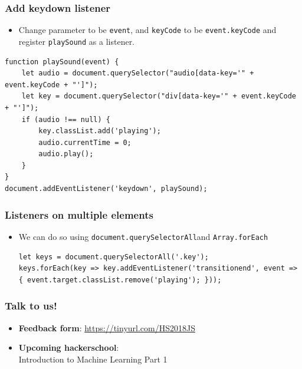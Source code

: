 \documentclass[handout,12pt]{beamer}
\begin{document}
\begin{frame}[fragile]
	\frametitle{Add keydown listener}
	\begin{itemize}
		\item Change parameter to be \texttt{event}, and \texttt{keyCode} to be \texttt{event.keyCode} and register \texttt{playSound} as a listener.
	\end{itemize}
	\begin{verbatim}
function playSound(event) {
	let audio = document.querySelector("audio[data-key='" + event.keyCode + "']");
	let key = document.querySelector("div[data-key='" + event.keyCode + "']");
	if (audio !== null) {
		key.classList.add('playing');
		audio.currentTime = 0;
		audio.play();
	}
}
document.addEventListener('keydown', playSound);
	\end{verbatim}
\end{frame}

\begin{frame}[fragile]
	\frametitle{Listeners on multiple elements}
	\begin{itemize}
		\item We can do so using \texttt{document.querySelectorAll}\footnotemark and \texttt{Array.forEach}\footnotemark\pause
		\begin{verbatim}
let keys = document.querySelectorAll('.key');
keys.forEach(key => key.addEventListener('transitionend', event => { event.target.classList.remove('playing'); }));
		\end{verbatim}
	\end{itemize}
\end{frame}

\begin{frame}
	\frametitle{Talk to us!}
	\begin{itemize}
		\item \textbf{Feedback form}: \url{https://tinyurl.com/HS2018JS}
		\item \textbf{Upcoming hackerschool}:\\
		Introduction to Machine Learning Part 1
	\end{itemize}
\end{frame}
\end{document}
